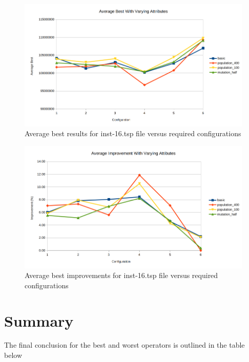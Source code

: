 \begin{figure}[H]
\vspace{-5pt}
\centering
\includegraphics[width=1.0\textwidth]{images/inst-16-average-best.png}
\caption{\label{fig:inst-16-average-best}Average best results for inst-16.tsp file versus required configurations}
\end{figure}

\begin{figure}[H]
\vspace{-5pt}
\centering
\includegraphics[width=1.0\textwidth]{images/inst-16-best-improvements.png}
\caption{\label{fig:inst-16-best-improvements}Average best improvements for inst-16.tsp file versus required configurations}
\end{figure}

\section{Summary}

The final conclusion for the best and worst operators is outlined in the table below

